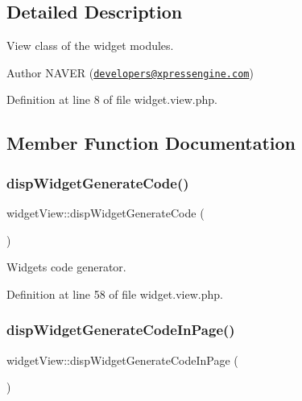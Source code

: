 \subsection{Detailed Description}
View class of the widget modules. 

\begin{DoxyAuthor}{Author}
N\+A\+V\+ER (\href{mailto:developers@xpressengine.com}{\tt developers@xpressengine.\+com}) 
\end{DoxyAuthor}


Definition at line 8 of file widget.\+view.\+php.



\subsection{Member Function Documentation}
\hypertarget{classwidgetView_af0e573b3b57857bc0941237399e21b19}{}\label{classwidgetView_af0e573b3b57857bc0941237399e21b19} 
\subsubsection{\texorpdfstring{disp\+Widget\+Generate\+Code()}{dispWidgetGenerateCode()}}
{\footnotesize\ttfamily widget\+View\+::disp\+Widget\+Generate\+Code (\begin{DoxyParamCaption}{ }\end{DoxyParamCaption})}



Widget\textquotesingle{}s code generator. 



Definition at line 58 of file widget.\+view.\+php.

\hypertarget{classwidgetView_a0600670ca5dac17d9549bacecd90c3cf}{}\label{classwidgetView_a0600670ca5dac17d9549bacecd90c3cf} 
\subsubsection{\texorpdfstring{disp\+Widget\+Generate\+Code\+In\+Page()}{dispWidgetGenerateCodeInPage()}}
{\footnotesize\ttfamily widget\+View\+::disp\+Widget\+Generate\+Code\+In\+Page (\begin{DoxyParamCaption}{ }\end{DoxyParamCaption})}



